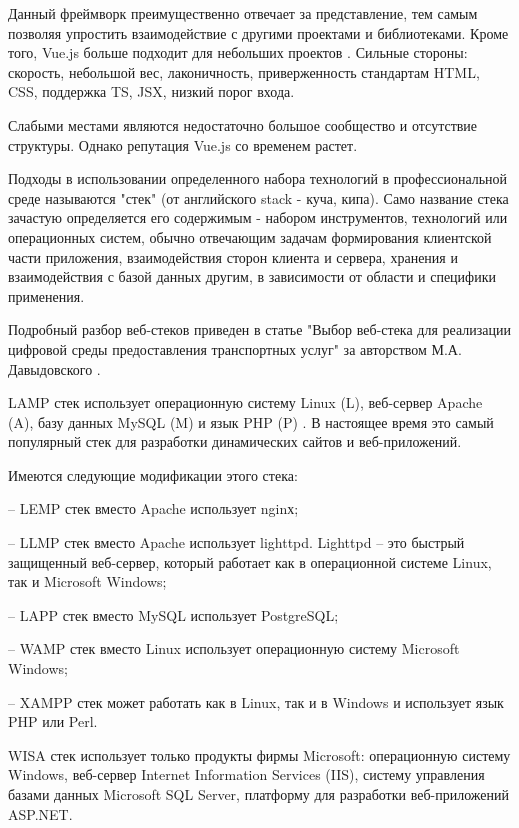 Данный фреймворк преимущественно отвечает за представление, тем самым позволяя упростить
взаимодействие с другими проектами и библиотеками.
Кроме того, Vue.js больше подходит для небольших проектов \cite{sergacheva-framework-4}.
Сильные стороны: скорость, небольшой вес, лаконичность, приверженность стандартам HTML, CSS, поддержка TS, JSX, низкий порог входа.

Слабыми местами являются недостаточно большое сообщество и отсутствие структуры.
Однако репутация Vue.js со временем растет.


Подходы в использовании определенного набора технологий в профессиональной среде называются "стек" (от английского stack - куча, кипа).
Само название стека зачастую определяется его содержимым - набором инструментов, технологий или операционных систем, обычно отвечающим  задачам формирования клиентской части приложения, взаимодействия сторон клиента и сервера, хранения и взаимодействия с базой данных другим, в зависимости от области и специфики применения.


Подробный разбор веб-стеков приведен в статье "Выбор веб-стека для реализации цифровой среды предоставления транспортных услуг" за авторством М.А. Давыдовского \cite{davidovsky-vibor}.


LAMP стек \cite{davidovsky-vibor-1} использует операционную систему Linux (L), веб-сервер Apache (A), базу данных MySQL (M) и язык PHP (P) \cite{davidovsky-vibor-php}.
В настоящее время это самый популярный стек для разработки динамических сайтов и веб-приложений.

Имеются следующие модификации этого стека: 

-- LEMP стек вместо Apache использует nginх;

-- LLMP стек вместо Apache использует lighttpd. Lighttpd -- это быстрый защищенный веб-сервер, который работает как в операционной системе Linux, так и Microsoft Windows;

-- LAPP стек вместо MySQL использует PostgreSQL;

-- WAMP стек вместо Linux использует операционную систему Microsoft Windows;

-- XAMPP стек может работать как в Linux, так и в Windows и использует язык PHP или Perl.


WISA стек использует только продукты фирмы Microsoft: операционную систему Windows, веб-сервер Internet Information Services (IIS), систему управления базами данных Microsoft SQL Server, платформу для разработки веб-приложений ASP.NET.

